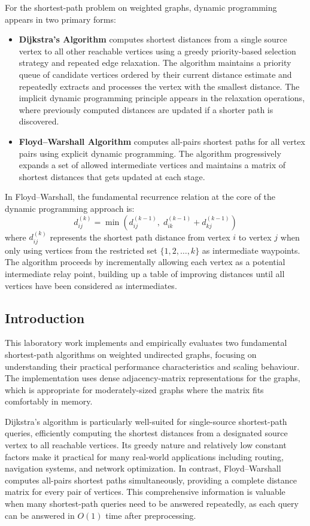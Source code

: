 \documentclass[12pt]{article}
\begin{document}
For the shortest-path problem on weighted graphs, dynamic programming appears in two primary forms:

\begin{itemize}[itemsep=1pt]
  \item \textbf{Dijkstra's Algorithm} computes shortest distances from a single source vertex to
  all other reachable vertices using a greedy priority-based selection strategy and repeated edge
  relaxation. The algorithm maintains a priority queue of candidate vertices ordered by their
  current distance estimate and repeatedly extracts and processes the vertex with the smallest
  distance. The implicit dynamic programming principle appears in the relaxation operations,
  where previously computed distances are updated if a shorter path is discovered.
  \item \textbf{Floyd--Warshall Algorithm} computes all-pairs shortest paths for all vertex pairs
  using explicit dynamic programming. The algorithm progressively expands a set of allowed intermediate
  vertices and maintains a matrix of shortest distances that gets updated at each stage.
\end{itemize}

In Floyd--Warshall, the fundamental recurrence relation at the core of the dynamic programming
approach is:
\[
d_{ij}^{(k)} = \min\left(d_{ij}^{(k-1)},\; d_{ik}^{(k-1)} + d_{kj}^{(k-1)}\right)
\]
where $d_{ij}^{(k)}$ represents the shortest path distance from vertex $i$ to vertex $j$ when only
using vertices from the restricted set $\{1,2,\dots,k\}$ as intermediate waypoints. The algorithm
proceeds by incrementally allowing each vertex as a potential intermediate relay point, building
up a table of improving distances until all vertices have been considered as intermediates.

\subsection{Introduction}

This laboratory work implements and empirically evaluates two fundamental shortest-path
algorithms on weighted undirected graphs, focusing on understanding their practical performance
characteristics and scaling behaviour. The implementation uses dense adjacency-matrix representations
for the graphs, which is appropriate for moderately-sized graphs where the matrix fits comfortably
in memory.

Dijkstra's algorithm is particularly well-suited for single-source shortest-path queries, efficiently
computing the shortest distances from a designated source vertex to all reachable vertices. Its
greedy nature and relatively low constant factors make it practical for many real-world applications
including routing, navigation systems, and network optimization. In contrast, Floyd--Warshall
computes all-pairs shortest paths simultaneously, providing a complete distance matrix for every
pair of vertices. This comprehensive information is valuable when many shortest-path queries need
to be answered repeatedly, as each query can be answered in $O(1)$ time after preprocessing.
\end{document}

